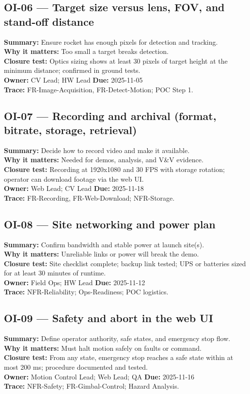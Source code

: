 \documentclass[12pt]{article}
\begin{document}
\subsection*{OI-06 — Target size versus lens, FOV, and stand-off distance}
\textbf{Summary:} Ensure rocket has enough pixels for detection and tracking.\\
\textbf{Why it matters:} Too small a target breaks detection.\\
\textbf{Closure test:} Optics sizing shows at least 30 pixels of target height at the minimum distance; confirmed in ground tests.\\
\textbf{Owner:} CV Lead; HW Lead \quad \textbf{Due:} 2025-11-05\\
\textbf{Trace:} FR-Image-Acquisition, FR-Detect-Motion; POC Step 1.

\subsection*{OI-07 — Recording and archival (format, bitrate, storage, retrieval)}
\textbf{Summary:} Decide how to record video and make it available.\\
\textbf{Why it matters:} Needed for demos, analysis, and V\&V evidence.\\
\textbf{Closure test:} Recording at 1920x1080 and 30 FPS with storage rotation; operator can download footage via the web UI.\\
\textbf{Owner:} Web Lead; CV Lead \quad \textbf{Due:} 2025-11-18\\
\textbf{Trace:} FR-Recording, FR-Web-Download; NFR-Storage.

\subsection*{OI-08 — Site networking and power plan}
\textbf{Summary:} Confirm bandwidth and stable power at launch site(s).\\
\textbf{Why it matters:} Unreliable links or power will break the demo.\\
\textbf{Closure test:} Site checklist complete; backup link tested; UPS or batteries sized for at least 30 minutes of runtime.\\
\textbf{Owner:} Field Ops; HW Lead \quad \textbf{Due:} 2025-11-12\\
\textbf{Trace:} NFR-Reliability; Ops-Readiness; POC logistics.

\subsection*{OI-09 — Safety and abort in the web UI}
\textbf{Summary:} Define operator authority, safe states, and emergency stop flow.\\
\textbf{Why it matters:} Must halt motion safely on faults or command.\\
\textbf{Closure test:} From any state, emergency stop reaches a safe state within at most 200 ms; procedure documented and tested.\\
\textbf{Owner:} Motion Control Lead; Web Lead; QA \quad \textbf{Due:} 2025-11-16\\
\textbf{Trace:} NFR-Safety; FR-Gimbal-Control; Hazard Analysis.
\end{document}
